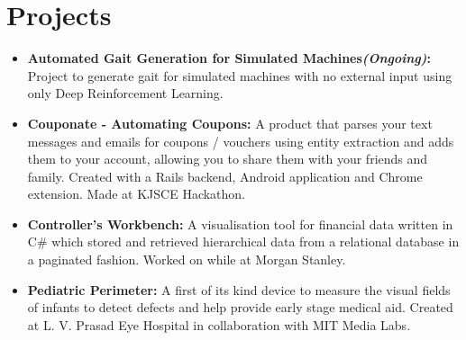 \documentclass[letterpaper,8pt]{article}
\newcommand{\resumeItem}[2]{
  \item\small{
    \textbf{#1}{: #2 \vspace{-2pt}}
  }
}
\newcommand{\resumeSubItem}[2]{\resumeItem{#1}{#2}\vspace{-4pt}}
\newcommand{\resumeSubHeadingListStart}{\begin{itemize}[leftmargin=*]}
\newcommand{\resumeSubHeadingListEnd}{\end{itemize}}
\begin{document}
  
\section{Projects}
  \resumeSubHeadingListStart
    \item{
      \textbf{Automated Gait Generation for Simulated Machines{\em (Ongoing)}:}{ Project to generate gait for simulated machines with no external input using only Deep Reinforcement Learning.}
      \hfill
    }
    \vspace{-4pt}
    \item{
      \textbf{Couponate - Automating Coupons:}{ A product that parses your text messages and emails for coupons / vouchers using entity extraction and adds them to your account, allowing you to share them with your friends and family. Created with a Rails backend, Android application and Chrome extension. Made at KJSCE Hackathon.}
      \hfill
    }
    \vspace{-4pt}
    \item{
      \textbf{Controller's Workbench:}{ A visualisation tool for financial data written in C\# which stored and retrieved hierarchical data from a relational database in a paginated fashion. Worked on while at Morgan Stanley.}
      \hfill
    }
    \vspace{-4pt}
    \item{
      \textbf{Pediatric Perimeter:}{ A first of its kind device to measure the visual fields of infants to detect defects and help provide early stage medical aid. Created at L. V. Prasad Eye Hospital in collaboration with MIT Media Labs.}
      \hfill
    }
  \resumeSubHeadingListEnd
\end{document}
